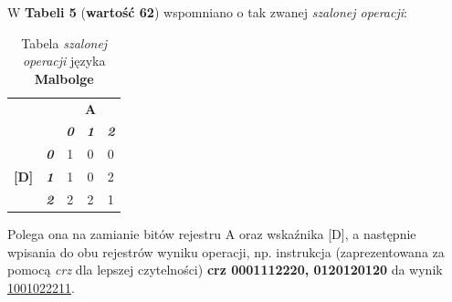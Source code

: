 \documentclass[fleqn,10pt]{SelfArx} %
\begin{document}
W \textbf{Tabeli 5} (\textbf{wartość 62}) wspomniano o tak zwanej \textit{szalonej operacji}:

\begin{table}[H]
	\begin{center}
	\begin{tabular}{|cc|ccc|}
	\hline
	\multicolumn{2}{|c|}{\multirow{2}{*}{}}                      & \multicolumn{3}{c|}{\textbf{A}}                                                \\ \cline{3-5} 
	\multicolumn{2}{|c|}{}                                       & \multicolumn{1}{c|}{\textit{\textbf{0}}} & \multicolumn{1}{c|}{\textit{\textbf{1}}} & \textit{\textbf{2}} \\ \hline
	\multicolumn{1}{|c|}{\textbf{}}        & \textit{\textbf{0}} & \multicolumn{1}{c|}{1}          & \multicolumn{1}{c|}{0}          & 0          \\ \cline{2-5} 
	\multicolumn{1}{|c|}{\textbf{{[}D{]}}} & \textit{\textbf{1}} & \multicolumn{1}{c|}{1}          & \multicolumn{1}{c|}{0}          & 2          \\ \cline{2-5} 
	\multicolumn{1}{|c|}{}                 & \textit{\textbf{2}} & \multicolumn{1}{c|}{2}          & \multicolumn{1}{c|}{2}          & 1          \\ \hline
	\end{tabular}
	\end{center}
	\caption{\centering Tabela \textit{szalonej operacji} języka \textbf{Malbolge}}
	\label{tab:malbolge!crazyOps}
\end{table}

Polega ona na zamianie bitów rejestru A oraz wskaźnika [D], a następnie wpisania do obu rejestrów wyniku operacji,
np. instrukcja (zaprezentowana za pomocą \textit{crz} dla lepszej czytelności) \textbf{crz 0001112220, 0120120120} da wynik \underline{1001022211}.
\end{document}
